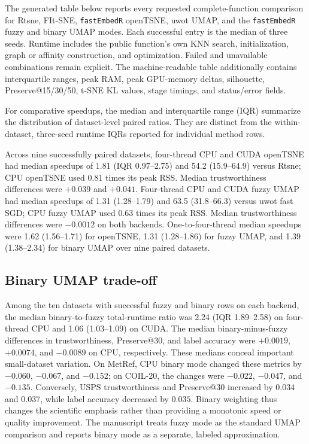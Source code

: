 \documentclass[twoside,11pt]{article}
\newcommand{\pkg}{\texttt{fastEmbedR}}
\begin{document}
The generated table below reports every requested complete-function comparison for Rtsne, FIt-SNE, \pkg{} openTSNE, uwot UMAP, and the \pkg{} fuzzy and binary UMAP modes. Each successful entry is the median of three seeds. Runtime includes the public function's own KNN search, initialization, graph or affinity construction, and optimization. Failed and unavailable combinations remain explicit. The machine-readable table additionally contains interquartile ranges, peak RAM, peak GPU-memory deltas, silhouette, Preserve@15/30/50, t-SNE KL values, stage timings, and status/error fields.

For comparative speedups, the median and interquartile range (IQR) summarize the distribution of dataset-level paired ratios. They are distinct from the within-dataset, three-seed runtime IQRs reported for individual method rows.



Across nine successfully paired datasets, four-thread CPU and CUDA openTSNE had median speedups of 1.81 (IQR 0.97--2.75) and 54.2 (15.9--64.9) versus Rtsne; CPU openTSNE used 0.81 times its peak RSS. Median trustworthiness differences were $+0.039$ and $+0.041$. Four-thread CPU and CUDA fuzzy UMAP had median speedups of 1.31 (1.28--1.79) and 63.5 (31.8--66.3) versus uwot fast SGD; CPU fuzzy UMAP used 0.63 times its peak RSS. Median trustworthiness differences were $-0.0012$ on both backends. One-to-four-thread median speedups were 1.62 (1.56--1.71) for openTSNE, 1.31 (1.28--1.86) for fuzzy UMAP, and 1.39 (1.38--2.34) for binary UMAP over nine paired datasets.

\subsection{Binary UMAP trade-off}

Among the ten datasets with successful fuzzy and binary rows on each backend,
the median binary-to-fuzzy total-runtime ratio was 2.24 (IQR 1.89--2.58) on
four-thread CPU and 1.06 (1.03--1.09) on CUDA. The median
binary-minus-fuzzy differences in trustworthiness,
Preserve@30, and label accuracy were $+0.0019$, $+0.0074$, and $-0.0089$ on
CPU, respectively. These medians conceal important small-dataset variation.
On MetRef, CPU binary mode changed these metrics by $-0.060$, $-0.067$, and
$-0.152$; on COIL-20, the changes were $-0.022$, $-0.047$, and $-0.135$.
Conversely, USPS trustworthiness and Preserve@30 increased by $0.034$ and
$0.037$, while label accuracy decreased by $0.035$. Binary weighting thus
changes the scientific emphasis rather than providing a monotonic speed or
quality improvement. The manuscript treats fuzzy mode as the standard UMAP
comparison and reports binary mode as a separate, labeled approximation.
\end{document}

